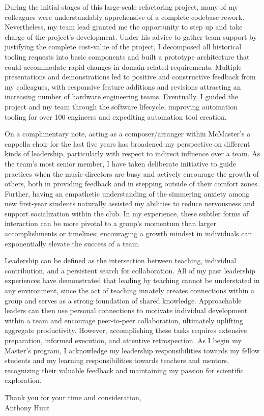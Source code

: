 \documentclass[11pt]{letter}
\begin{document}
During the initial stages of this large-scale refactoring project, many of my colleagues were understandably apprehensive of a complete codebase rework. Nevertheless, my team lead granted me the opportunity to step up and take charge of the project's development. Under his advice to gather team support by justifying the complete cost-value of the project, I decomposed all historical tooling requests into basic components and built a prototype architecture that could accommodate rapid changes in domain-related requirements. Multiple presentations and demonstrations led to positive and constructive feedback from my colleagues, with responsive feature additions and revisions attracting an increasing number of hardware engineering teams. Eventually, I guided the project and my team through the software lifecycle, improving automation tooling for over 100 engineers and expediting automation tool creation.

On a complimentary note, acting as a composer/arranger within McMaster's a cappella choir for the last five years has broadened my perspective on different kinds of leadership, particularly with respect to indirect influence over a team. As the team's most senior member, I have taken deliberate initiative to guide practices when the music directors are busy and actively encourage the growth of others, both in providing feedback and in stepping outside of their comfort zones. Further, having an empathetic understanding of the simmering anxiety among new first-year students naturally assisted my abilities to reduce nervousness and support socialization within the club. In my experience, these subtler forms of interaction can be more pivotal to a group's momentum than larger accomplishments or timelines; encouraging a growth mindset in individuals can exponentially elevate the success of a team.

Leadership can be defined as the intersection between teaching, individual contribution, and a persistent search for collaboration. All of my past leadership experiences have demonstrated that leading by teaching cannot be understated in any environment, since the act of teaching innately creates connections within a group and serves as a strong foundation of shared knowledge. Approachable leaders can then use personal connections to motivate individual development within a team and encourage peer-to-peer collaboration, ultimately uplifting aggregate productivity. However, accomplishing these tasks requires extensive preparation, informed execution, and attentive retrospection. As I begin my Master's program, I acknowledge my leadership responsibilities towards my fellow students and my learning responsibilities towards teachers and mentors, recognizing their valuable feedback and maintaining my passion for scientific exploration.

\setlength\parindent{0pt}

Thank you for your time and consideration,
\\
Anthony Hunt
\end{document}
